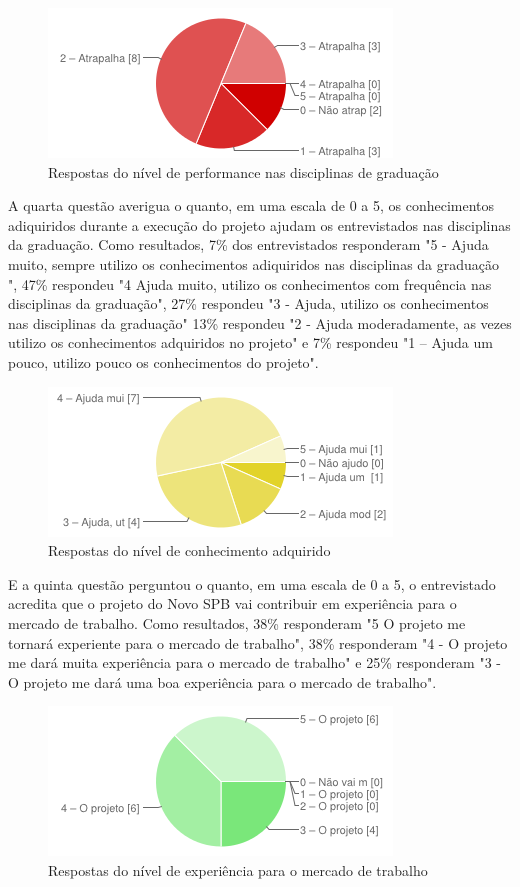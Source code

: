 \begin{figure}[htpb]
  \begin{center}
    \includegraphics[width=.37\textwidth]{images/chart2.png}
  \end{center}
  \caption{Respostas do nível de performance nas disciplinas de graduação}
  \label{fig:core_concurrent}
\end{figure} 

A quarta questão averigua o quanto, em uma escala de 0 a 5, os conhecimentos adiquiridos durante a execução do projeto ajudam os entrevistados nas disciplinas da graduação. Como resultados, 7\% dos entrevistados responderam "5 - Ajuda muito, sempre utilizo os conhecimentos adiquiridos nas disciplinas da graduação	", 47\% respondeu "4  Ajuda muito, utilizo os conhecimentos com frequência nas disciplinas da graduação", 27\% respondeu "3 - Ajuda, utilizo os conhecimentos nas disciplinas da graduação" 13\% respondeu "2 - Ajuda moderadamente, as vezes utilizo os conhecimentos adquiridos no projeto" e 7\% respondeu "1 – Ajuda um pouco, utilizo pouco os conhecimentos do projeto".

\begin{figure}[htpb]
  \begin{center}
    \includegraphics[width=.37\textwidth]{images/chart3.png}
  \end{center}
  \caption{Respostas do nível de conhecimento adquirido}
  \label{fig:core_concurrent}
\end{figure} 

E a quinta questão perguntou o quanto, em uma escala de 0 a 5, o entrevistado acredita que o projeto do Novo SPB vai contribuir em experiência para o mercado de trabalho. Como resultados, 38\% responderam "5  O projeto me tornará experiente para o mercado de trabalho", 38\% responderam "4 - O projeto me dará muita experiência para o mercado de trabalho" e 25\% responderam "3 - O projeto me dará uma boa experiência para o mercado de trabalho".

\begin{figure}[htpb]
  \begin{center}
    \includegraphics[width=.37\textwidth]{images/chart4.png}
  \end{center}
  \caption{Respostas do nível de experiência para o mercado de trabalho}
  \label{fig:core_concurrent}
\end{figure} 

